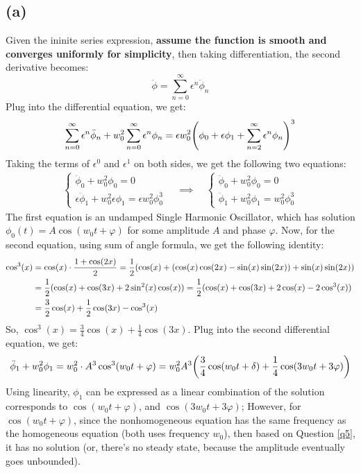 \documentclass{article}
\DeclarePairedDelimiter{\paran}{(}{)}%
\begin{document}
\subsection*{(a)}
Given the ininite series expression, \textbf{assume the function is smooth and converges uniformly for simplicity}, then taking differentiation, the second derivative becomes:
\begin{equation}
    \ddot\phi = \sum_{n=0}^{\infty}\epsilon^n \ddot\phi_n
\end{equation}
Plug into the differential equation, we get:
\begin{align}
    \sum_{n=0}^{\infty}\epsilon^n \ddot\phi_n + w_0^2\sum_{n=0}^{\infty}\epsilon^n \phi_n = \epsilon w_0^2\paran*{\phi_0 + \epsilon\phi_1 + \sum_{n=2}^{\infty}\epsilon^n \phi_n}^3
\end{align}
Taking the terms of $\epsilon^0$ and $\epsilon^1$ on both sides, we get the following two equations:
\begin{align}
    \begin{cases}
        \ddot \phi_0 + w_0^2\phi_0 = 0\\
        \epsilon \ddot\phi_1 + w_0^2\epsilon \phi_1 = \epsilon w_0^2\phi_0^3
    \end{cases}\quad \implies \quad \begin{cases}
        \ddot \phi_0 + w_0^2\phi_0 = 0\\
        \ddot\phi_1 + w_0^2\phi_1 = w_0^2\phi_0^3
    \end{cases}
\end{align}
The first equation is an undamped Single Harmonic Oscillator, which has solution $\phi_0(t) = A\cos(w_0t+\varphi)$ for some amplitude $A$ and phase $\varphi$. Now, for the second equation, using sum of angle formula, we get the following identity:
\begin{align}
    \cos^3(x) &= \cos(x)\cdot \frac{1+\cos(2x)}{2} = \frac{1}{2}\paran*{\cos(x)+(\cos(x)\cos(2x)-\sin(x)\sin(2x))+\sin(x)\sin(2x)}\\
    &= \frac{1}{2}(\cos(x)+\cos(3x)+2\sin^2(x)\cos(x)) = \frac{1}{2}(\cos(x)+\cos(3x)+2\cos(x)-2\cos^3(x))\\
    &=\frac{3}{2}\cos(x)+\frac{1}{2}\cos(3x)-\cos^3(x)
\end{align}
So, $\cos^3(x) = \frac{3}{4}\cos(x)+\frac{1}{4}\cos(3x)$. Plug into the second differential equation, we get:
\begin{equation}
    \ddot\phi_1 +w_0^2\phi_1 = w_0^2\cdot A^3\cos^3(w_0t+\varphi) = w_0^2A^3\paran*{\frac{3}{4}\cos(w_0t+\delta)+\frac{1}{4}\cos(3w_0t+3\varphi)}
\end{equation}
Using linearity, $\phi_1$ can be expressed as a linear combination of the solution corresponds to $\cos(w_0t+\varphi)$, and $\cos(3w_0t+3\varphi)$; However, for $\cos(w_0t+\varphi)$, since the nonhomogeneous equation has the same frequency as the homogeneous equation (both uses frequency $w_0$), then based on Question \ref{q5}, it has no solution (or, there's no steady state, because the amplitude eventually goes unbounded).
\end{document}
